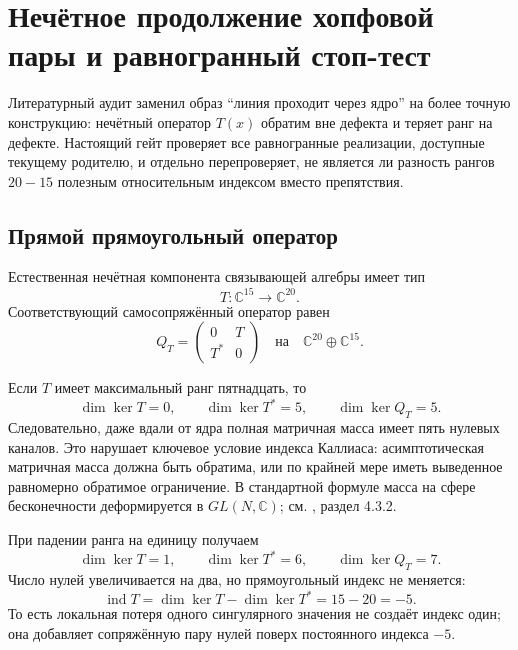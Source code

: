 \chapter{Нечётное продолжение хопфовой пары и равногранный стоп-тест}

Литературный аудит заменил образ ``линия проходит через ядро'' на более
точную конструкцию: нечётный оператор $T(x)$ обратим вне дефекта и теряет
ранг на дефекте. Настоящий гейт проверяет все равногранные реализации,
доступные текущему родителю, и отдельно перепроверяет, не является ли
разность рангов $20-15$ полезным относительным индексом вместо
препятствия.

\section{Прямой прямоугольный оператор}

Естественная нечётная компонента связывающей алгебры имеет тип
\begin{equation}
 T:\mathbb C^{15}\longrightarrow\mathbb C^{20}.
 \label{eq:v5-odd-core-rectangular-T}
\end{equation}
Соответствующий самосопряжённый оператор равен
\begin{equation}
 Q_T=
 \begin{pmatrix}
 0&T\\T^*&0
 \end{pmatrix}
 \quad\text{на}\quad
 \mathbb C^{20}\oplus\mathbb C^{15}.
 \label{eq:v5-odd-core-selfadjoint-Q}
\end{equation}

Если $T$ имеет максимальный ранг пятнадцать, то
\begin{equation}
 \dim\ker T=0,
 \qquad
 \dim\ker T^*=5,
 \qquad
 \dim\ker Q_T=5.
 \label{eq:v5-odd-core-asymptotic-nullity}
\end{equation}
Следовательно, даже вдали от ядра полная матричная масса имеет пять
нулевых каналов. Это нарушает ключевое условие индекса Каллиаса:
асимптотическая матричная масса должна быть обратима, или по крайней мере
иметь выведенное равномерно обратимое ограничение. В стандартной формуле
масса на сфере бесконечности деформируется в $GL(N,\mathbb C)$; см.
, раздел 4.3.2.

При падении ранга на единицу получаем
\begin{equation}
 \dim\ker T=1,
 \qquad
 \dim\ker T^*=6,
 \qquad
 \dim\ker Q_T=7.
\end{equation}
Число нулей увеличивается на два, но прямоугольный индекс не меняется:
\begin{equation}
 \operatorname{ind}T
 =\dim\ker T-\dim\ker T^*
 =15-20=-5.
 \label{eq:v5-odd-core-constant-index}
\end{equation}
То есть локальная потеря одного сингулярного значения не создаёт индекс
один; она добавляет сопряжённую пару нулей поверх постоянного индекса
$-5$.

